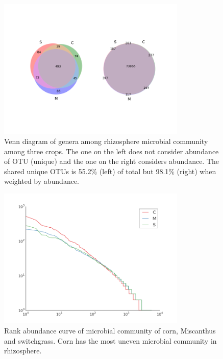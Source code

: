 \documentclass[12pt]{article}
\begin{document}
{    \begin{figure}[tbph!]
    \centering
    \includegraphics[width=0.8\textwidth]{figures/genus.venn}
    \caption[Venn diagram of genera]{Venn diagram of genera among rhizosphere microbial community among three crops. The one on the left does not consider abundance of OTU (unique) and the one on the right considers abundance. The shared unique OTUs is 55.2\% (left) of total but 98.1\% (right) when weighted by abundance.}
    \label{fig:genus.venn}
    \end{figure}


    \begin{figure}[tbph!]
    \centering
    \includegraphics[width=0.8\textwidth]{figures/otu.rankabuncurve}
    \caption[Rank abundance curve]{Rank abundance curve of microbial community of corn, Miscanthus and switchgrass. Corn has the most uneven microbial community in rhizosphere.}
    \label{fig:otu.rankabuncurve}
    \end{figure}


}
\end{document}
